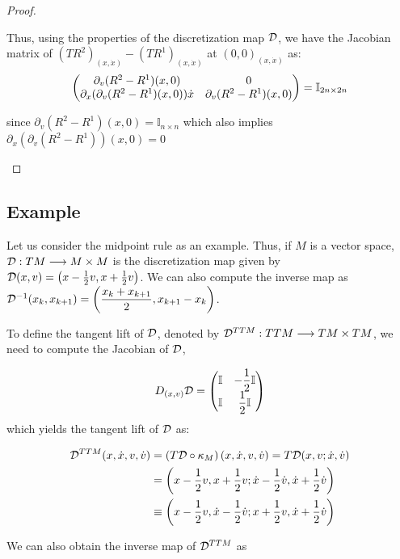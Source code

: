 \begin{proof}
\begin{enumerate}
      \vspace{-1mm}
      Thus, using the properties of the discretization map $\mathcal{D}$, we have the Jacobian matrix of $(TR^2)_{(x, \dot{x})} - (TR^1)_{(x, \dot{x})}$ at $(0,0)_{(x, \dot{x})}$ as:
      \[\begin{pmatrix}
      \partial_{v}(R^2-R^1)(x,0) & 0 \\
      \partial_x(\partial_v(R^2 - R^1)(x,0))\dot{x} & \partial_v (R^2-R^1)(x,0)
      \end{pmatrix} = \mathbb{I}_{2n \times 2n}
      \]

      \vspace{-1mm}
      since $\partial_v (R^2-R^1)(x,0) = \mathbb{I}_{n \times n}$ which also implies $\partial_x(\partial_v(R^2 - R^1))(x,0) = 0$
  \end{enumerate}
\end{proof}

\subsection{Example}
\label{ex:midpoint-disc}
Let us consider the midpoint rule as an example. Thus, if $M$ is a vector space, $\mathcal{D} : TM \longrightarrow M \times M$ is the discretization map given by $\mathcal{D}(x,v) = \left( x - \frac{1}{2}v, x + \frac{1}{2}v \right)$. We can also compute the inverse map as $\mathcal{D}^{-1}(x_k, x_{k+1}) = \left(\dfrac{x_k + x_{k+1}}{2}, x_{k+1} - x_k \right)$.

\newpage

To define the tangent lift of $\mathcal{D}$, denoted by $\mathcal{D}^{TTM}: TTM \longrightarrow TM \times TM$, we need to compute the Jacobian of $\mathcal{D}$,

\[
  D_{(x,v)} \mathcal{D} = \begin{pmatrix}\mathbb{I} & -\dfrac{1}{2} \mathbb{I} \\ \mathbb{I} & \dfrac{1}{2} \mathbb{I}\end{pmatrix}
\]
which yields the tangent lift of $\mathcal{D}$ as:

\begin{equation*}
  \begin{split}
    \mathcal{D}^{TTM} (x, \dot{x}, v, \dot{v}) &= (T\mathcal{D} \circ \kappa_M)\left( x, \dot{x}, v, \dot{v} \right) = T\mathcal{D}(x, v ; \dot{x}, \dot{v}) \\
    &= \left( x - \dfrac{1}{2}v, x + \dfrac{1}{2}v ; \dot{x} - \dfrac{1}{2}\dot{v}, \dot{x} + \dfrac{1}{2} \dot{v} \right) \\
    & \equiv \left( x - \dfrac{1}{2}v, \dot{x} - \dfrac{1}{2}\dot{v} ; x + \dfrac{1}{2}v, \dot{x} + \dfrac{1}{2} \dot{v} \right)
  \end{split}
\end{equation*}

We can also obtain the inverse map of $\mathcal{D}^{TTM}$ as 

